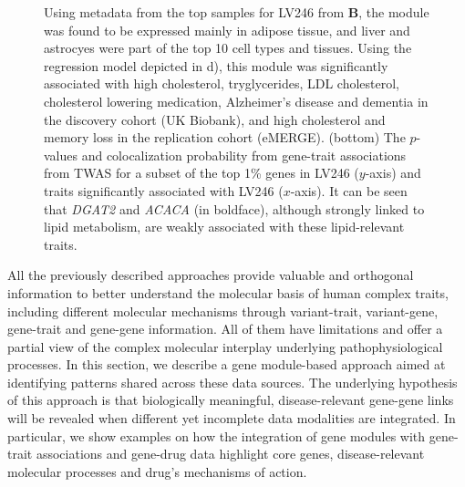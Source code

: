 \begin{figure}
{{Using metadata from the top samples for LV246 from \(\mathbf{B}\), the module was found to be expressed mainly in adipose tissue, and liver and astrocyes were part of the top 10 cell types and tissues.
Using the regression model depicted in d), this module was significantly associated with high cholesterol, tryglycerides, LDL cholesterol, cholesterol lowering medication, Alzheimer's disease and dementia in the discovery cohort (UK Biobank), and high cholesterol and memory loss in the replication cohort (eMERGE).
(bottom) The \(p\)-values and colocalization probability from gene-trait associations from TWAS for a subset of the top 1\% genes in LV246 (\(y\)-axis) and traits significantly associated with LV246 (\(x\)-axis).
It can be seen that \emph{DGAT2} and \emph{ACACA} (in boldface), although strongly linked to lipid metabolism, are weakly associated with these lipid-relevant traits.}\label{fig:fig4}
}
\end{figure}

All the previously described approaches provide valuable and orthogonal information to better understand the molecular basis of human complex traits, including different molecular mechanisms through variant-trait, variant-gene, gene-trait and gene-gene information.
All of them have limitations and offer a partial view of the complex molecular interplay underlying pathophysiological processes.
In this section, we describe a gene module-based approach aimed at identifying patterns shared across these data sources.
The underlying hypothesis of this approach is that biologically meaningful, disease-relevant gene-gene links will be revealed when different yet incomplete data modalities are integrated.
In particular, we show examples on how the integration of gene modules with gene-trait associations and gene-drug data highlight core genes, disease-relevant molecular processes and drug's mechanisms of action.

